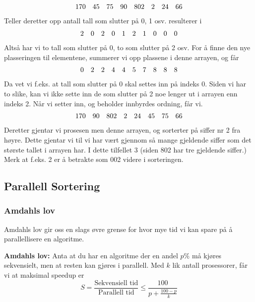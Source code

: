 \begin{eks}
  \begin{displaymath}
    \begin{array}{c c c c c c c c}
      170&45&75&90&802&2&24&66
    \end{array}
  \end{displaymath}
  Teller deretter opp antall tall som slutter på 0, 1 osv. resulterer i
  \begin{displaymath}
    \begin{array}{c c c c c c c c c c}
      2&0&2&0&1&2&1&0&0&0
    \end{array}
  \end{displaymath}
  Altså har vi to tall som slutter på 0, to som slutter på 2 osv. For å finne
  den nye plasseringen til elementene, summerer vi opp plassene i denne arrayen,
  og får
  \begin{displaymath}
    \begin{array}{c c c c c c c c c c}
      0&2&2&4&4&5&7&8&8&8
    \end{array}
  \end{displaymath}
  Da vet vi f.eks. at tall som slutter på 0 skal settes inn på indeks 0. Siden
  vi har to slike, kan vi ikke sette inn de som slutter på 2 noe lenger ut i
  arrayen enn indeks 2. Når vi setter inn, og beholder innbyrdes ordning, får
  vi.
  \begin{displaymath}
    \begin{array}{c c c c c c c c}
      170&90&802&2&24&45&75&66
    \end{array}
  \end{displaymath}
  Deretter gjentar vi prosesen men denne arrayen, og sorterter på siffer nr 2
  fra høyre. Dette gjentar vi til vi har vært gjennom så mange gjeldende siffer
  som det største tallet i arrayen har. I dette tilfellet 3 (siden 802 har tre
  gjeldende siffer.) Merk at f.eks. 2 er å betrakte som 002 videre i sorteringen.
\end{eks}

\subsection{Parallell Sortering}

\subsubsection{Amdahls lov}
\label{sec:amdahl}

Amdahls lov gir oss en slags øvre grense for hvor mye tid vi kan spare på å
parallellisere en algoritme.
\begin{teorem}\textbf{Amdahls lov: } 
  Anta at du har en algoritme der en andel
  $p\%$ må kjøres sekvensielt, men at resten kan gjøres i parallell.
  Med $k$ lik antall prosessorer, får vi at maksimal speedup er
  \[
    S = \frac{\text{Sekvensiell tid}}{\text{Parallell tid}} \leq \frac{100}{p + \frac{100 - p}{k}}
  \]
\end{teorem}

